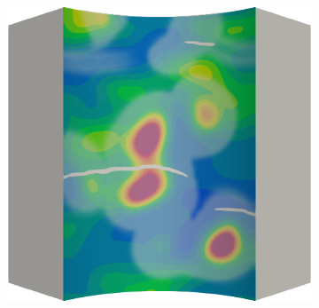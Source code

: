 \begin{frame}
\begin{columns}[T]
\begin{column}{0.6\textwidth}
\begin{figure}
{\begin{subfigure}{0.19\textwidth}
          \end{subfigure}
          \hspace{0.06\textwidth}
          \begin{subfigure}{0.19\textwidth}
            \centering
            \includegraphics[width=\textwidth]{examples/figures/ep.0027}
          \end{subfigure}
        }
        

\end{figure}
\end{column}
\end{columns}
\end{frame}
